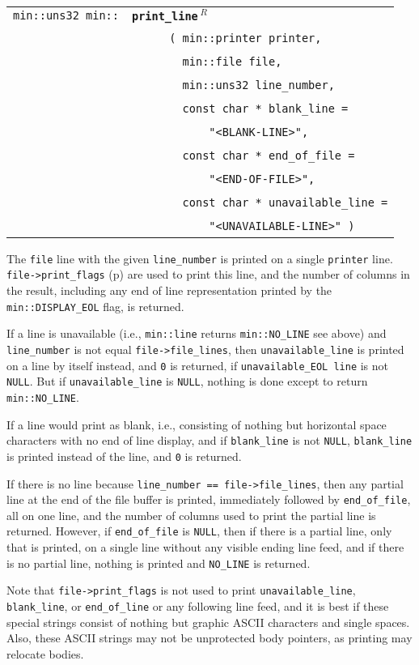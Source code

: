 \documentclass[12pt]{article}
\makeatletter
\newcommand{\ttindex}[1]{\index{#1@{\tt #1}}}
\newcommand{\minindex}[1]{\ttindex{min::#1}\ttindex{#1}}
\newcommand{\pagref}[1]{p\pageref{#1}}
\newcommand{\EOL}{\penalty \exhyphenpenalty}
\newenvironment{indpar}[1][0.3in]%
	{\begin{list}{}%
		     {\setlength{\itemsep}{0in}%
		      \setlength{\topsep}{0in}%
		      \setlength{\parsep}{1ex}%
		      \setlength{\labelwidth}{#1}%
		      \setlength{\leftmargin}{#1}%
		      \addtolength{\leftmargin}{\labelsep}}%
	 \item}%
	{\end{list}}
\newcommand{\LABEL}[1]{\label{#1}}
\newcommand{\ARGBREAK}{\\&{\tt ~~~~}}
\newcommand{\MINKEY}[1]{{\tt \bf #1}\minindex{#1}}
\newcommand{\REL}{$\,^R$}
\makeatother
\begin{document}
\begin{indpar}[1em]\begin{tabular}{r@{}l}
\verb|min::uns32 min::|
    & \MINKEY{print\_\EOL line\REL}\ARGBREAK
      \verb| ( min::printer printer,|\ARGBREAK
      \verb|   min::file file,|\ARGBREAK
      \verb|   min::uns32 line_number,|\ARGBREAK
      \verb|   const char * blank_line =|\ARGBREAK
      \verb|       "<BLANK-LINE>",|\ARGBREAK
      \verb|   const char * end_of_file =|\ARGBREAK
      \verb|       "<END-OF-FILE>",|\ARGBREAK
      \verb|   const char * unavailable_line =|\ARGBREAK
      \verb|       "<UNAVAILABLE-LINE>" )|
\LABEL{MIN::PRINT_LINE} \\
\end{tabular}\end{indpar}

The {\tt file} line with the given {\tt line\_number}
is printed on a single {\tt printer} line.  {\tt file->\EOL print\_\EOL flags}
(\pagref{FILE_PRINT_FLAGS})
are used to print this line, and the number of columns in the result,
including any end of line representation printed by the
{\tt min::\EOL DISPLAY\_\EOL EOL} flag, is returned.

If a line is
unavailable (i.e., {\tt min::\EOL line} returns {\tt min::\EOL NO\_\EOL LINE}
see above)
and {\tt line\_\EOL number} is not equal {\tt file->\EOL file\_\EOL lines},
then {\tt unavailable\_\EOL line} is printed on a line by itself instead, and
{\tt 0} is returned, if {\tt unavailable\_EOL line} is not {\tt NULL}.
But if {\tt unavailable\_\EOL line} is {\tt NULL}, nothing is done except
to return {\tt min::\EOL NO\_\EOL LINE}.

If a line would print as blank, i.e., consisting of
nothing but horizontal space characters with no end of line display, and if
{\tt blank\_\EOL line} is not {\tt NULL},
{\tt blank\_\EOL line} is printed instead of the line, and {\tt 0} is returned.

If there is no line
because {\tt line\_\EOL number == file->\EOL file\_\EOL lines},
then any partial line at the end of the file buffer is printed,
immediately followed by {\tt end\_\EOL of\_\EOL file}, all on one line,
and the number of columns used to print the partial line is returned.
However, if {\tt end\_\EOL of\_\EOL file} is {\tt NULL}, then
if there is a partial line, only that is printed, on a single line
without any visible ending line feed, and if there is no partial line,
nothing is printed and {\tt NO\_\EOL LINE} is returned.

Note that
{\tt file->\EOL print\_\EOL flags} is not used to print
{\tt unavailable\_\EOL line}, {\tt blank\_\EOL line}, or
{\tt end\_\EOL of\_\EOL line} or any following line feed,
and it is best if these special strings consist of nothing but
graphic ASCII characters and single spaces.
Also, these ASCII strings may not be unprotected body pointers,
as printing may relocate bodies.
\end{document}
